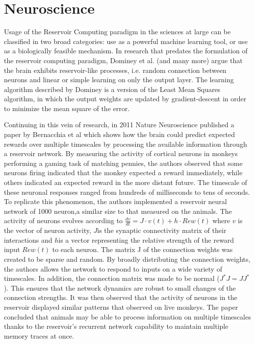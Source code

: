 \documentclass[12pt,oneside]{CUNY_CS_PhD}
\begin{document}
\section{Neuroscience}
Usage of the Reservoir Computing paradigm in the sciences at large can be classified in two broad categories: use as a powerful machine learning tool, or use as a biologically feasible mechanism. 
\label{dominey}
In research that predates the formulation of the reservoir computing paradigm, Dominey  et al. \cite{Dominey95, dominey1995complex} (and many more) argue that the brain exhibits reservoir-like processes, i.e. random connection between neurons and linear or simple learning on only the output layer. The learning algorithm described by Dominey is a version of the Least Mean Squares algorithm, in which the output weights are updated by gradient-descent in order to minimize the mean square of the error.

Continuing in this vein of research, in 2011 Nature Neuroscience published a paper by Bernacchia et al \cite{bernacchia_reservoir_2011} which shows how the brain could predict expected rewards over multiple timescales by processing the available information through a reservoir network. By measuring the activity of cortical neurons in monkeys performing a gaming task of matching pennies, the authors observed that some neurons firing indicated that the monkey expected a reward immediately, while others indicated an expected reward in the more distant future. The timescale of these neuronal responses ranged from hundreds of milliseconds to tens of seconds. To replicate this phenomenon, the authors implemented a reservoir neural network of 1000 neuron,a similar size to that measured on the animals. The activity of neurons evolves according to $\frac{dv}{dt} = J \cdot v(t) + h \cdot Rew(t)$ where $v$ is the vector of neuron activity, $J$is the synaptic connectivity matrix of their interactions and $h$is a vector representing the relative strength of the reward input $Rew(t)$ to each neuron. The matrix J of the connection weights was created to be sparse and random. By broadly distributing the connection weights, the authors allows the network to respond to inputs on a wide variety of timescales. In addition, the connection matrix was made to be normal ($J^*J = JJ^*$). This ensures \cite{spectra} that the network dynamics are robust to small changes of the connection strengths. It was then observed that the activity of neurons in the reservoir displayed similar patterns that observed on live monkeys. The paper concluded that animals may be able to process information on multiple timescales thanks to the reservoir's recurrent network capability to maintain multiple memory traces at once.
\newpage
\end{document}
